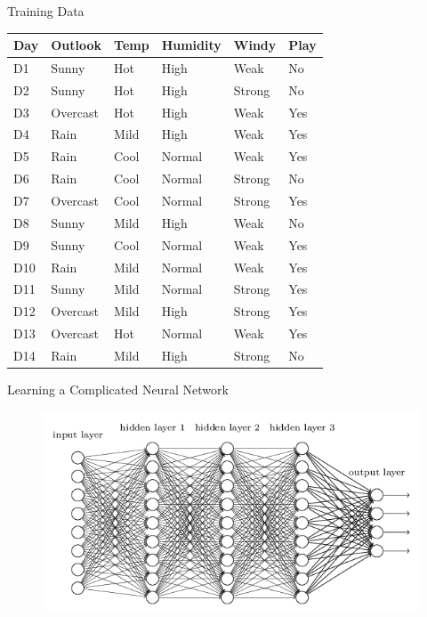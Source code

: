 \documentclass[usenames,dvipsnames]{beamer}
\begin{document}
	\renewcommand{\arraystretch}{0.85}
	\begin{frame}{Training Data}
	\begin{tabular}{lllll||l} \toprule
	\textbf{Day} & \textbf{Outlook}  & \textbf{Temp} & \textbf{Humidity} & \textbf{Windy}  & \textbf{Play} \\ \midrule
	D1  & Sunny    & Hot  & High     & Weak   & No   \\
	D2  & Sunny    & Hot  & High     & Strong & No   \\
	D3  & Overcast & Hot  & High     & Weak   & Yes  \\
	D4  & Rain     & Mild & High     & Weak   & Yes  \\
	D5  & Rain     & Cool & Normal   & Weak   & Yes  \\
	D6  & Rain     & Cool & Normal   & Strong & No   \\
	D7  & Overcast & Cool & Normal   & Strong & Yes  \\
	D8  & Sunny    & Mild & High     & Weak   & No   \\
	D9  & Sunny    & Cool & Normal   & Weak   & Yes  \\
	D10 & Rain     & Mild & Normal   & Weak   & Yes  \\
	D11 & Sunny    & Mild & Normal   & Strong & Yes  \\
	D12 & Overcast & Mild & High     & Strong & Yes  \\
	D13 & Overcast & Hot  & Normal   & Weak   & Yes  \\
	D14 & Rain     & Mild & High     & Strong & No  \\ \bottomrule
	\end{tabular}
\end{frame}

\begin{frame}{Learning a Complicated Neural Network}
\begin{figure}
	\centering
	\includegraphics[width=1\linewidth]{../assets/decision-trees/diagrams/neural}
	
	\label{fig:neural}
\end{figure}
\end{frame}
\end{document}
